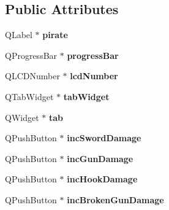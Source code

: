 \subsection*{Public Attributes}
\begin{DoxyCompactItemize}
\item 
\hypertarget{class_ui___pause_a98e7c02b762002d5e49cc11a19216c92}{Q\-Label $\ast$ {\bfseries pirate}}\label{class_ui___pause_a98e7c02b762002d5e49cc11a19216c92}

\item 
\hypertarget{class_ui___pause_a0f6b437e2e11c35eeeb173afb55e2f41}{Q\-Progress\-Bar $\ast$ {\bfseries progress\-Bar}}\label{class_ui___pause_a0f6b437e2e11c35eeeb173afb55e2f41}

\item 
\hypertarget{class_ui___pause_ae853eb73f144e6070615a2c4135a0bd0}{Q\-L\-C\-D\-Number $\ast$ {\bfseries lcd\-Number}}\label{class_ui___pause_ae853eb73f144e6070615a2c4135a0bd0}

\item 
\hypertarget{class_ui___pause_a02cec35c8d610e79dfd365a735607677}{Q\-Tab\-Widget $\ast$ {\bfseries tab\-Widget}}\label{class_ui___pause_a02cec35c8d610e79dfd365a735607677}

\item 
\hypertarget{class_ui___pause_ae67cc2921986e434f664f728095ed411}{Q\-Widget $\ast$ {\bfseries tab}}\label{class_ui___pause_ae67cc2921986e434f664f728095ed411}

\item 
\hypertarget{class_ui___pause_aca1dc186997c10b10301ba2e8c8766d3}{Q\-Push\-Button $\ast$ {\bfseries inc\-Sword\-Damage}}\label{class_ui___pause_aca1dc186997c10b10301ba2e8c8766d3}

\item 
\hypertarget{class_ui___pause_aaa48eb0c33b3b5919743b29ca60739de}{Q\-Push\-Button $\ast$ {\bfseries inc\-Gun\-Damage}}\label{class_ui___pause_aaa48eb0c33b3b5919743b29ca60739de}

\item 
\hypertarget{class_ui___pause_ae0629b76fc9d2433159a991fd85a52b4}{Q\-Push\-Button $\ast$ {\bfseries inc\-Hook\-Damage}}\label{class_ui___pause_ae0629b76fc9d2433159a991fd85a52b4}

\item 
\hypertarget{class_ui___pause_ac1bbd23d8f3fba52d05eabe522e1de73}{Q\-Push\-Button $\ast$ {\bfseries inc\-Broken\-Gun\-Damage}}\label{class_ui___pause_ac1bbd23d8f3fba52d05eabe522e1de73}


\end{DoxyCompactItemize}
